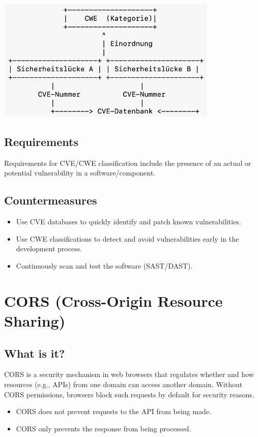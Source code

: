 \begin{center}
    \includegraphics[scale=1]{resources/01_cve_cwe.png}
\end{center}

\subsection*{Requirements}
Requirements for CVE/CWE classification include the presence of an actual or potential vulnerability in a software/component.

\subsection*{Countermeasures}
\begin{itemize}
    \item Use CVE databases to quickly identify and patch known vulnerabilities.
    \item Use CWE classifications to detect and avoid vulnerabilities early in the development process.
    \item Continuously scan and test the software (SAST/DAST).
\end{itemize}

\section*{CORS (Cross-Origin Resource Sharing)}
\subsection*{What is it?}
CORS is a security mechanism in web browsers that regulates whether and how resources (e.g., APIs) from one domain can access another domain. Without CORS permissions, browsers block such requests by default for security reasons.

\begin{itemize}
    \item CORS does not prevent requests to the API from being made.
    \item CORS only prevents the response from being processed.
\end{itemize}

